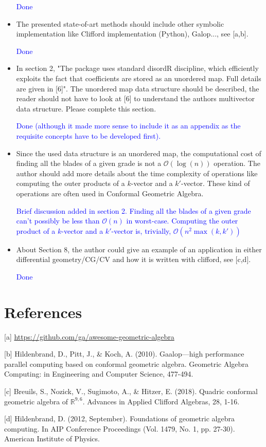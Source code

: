 \documentclass{article}
\begin{document}
\begin{itemize}
  \textcolor{blue}{Done}
  
\item The presented state-of-art methods should include other symbolic
  implementation like Clifford implementation (Python), Galop..., see
  [a,b].

  \textcolor{blue}{Done}

\item In section 2, "The package uses standard disordR discipline,
  which efficiently exploits the fact that coefficients are stored as
  an unordered map.  Full details are given in [6]".  The unordered
  map data structure should be described, the reader should not have
  to look at [6] to understand the authors multivector data
  structure. Please complete this section.

\textcolor{blue}{Done (although it made more sense to include it as an
  appendix as the requisite concepts have to be developed first).}
  
\item Since the used data structure is an unordered map, the
  computational cost of finding all the blades of a given grade is not
  a $\mathcal{O}(\log(n))$ operation.  The author should add more
  details about the time complexity of operations like computing the
  outer products of a $k$-vector and a $k'$-vector.  These kind of
  operations are often used in Conformal Geometric Algebra.

\textcolor{blue}{Brief discussion added in section 2.  Finding all the
  blades of a given grade can't possibly be less than $\mathcal{O}(n)$
  in worst-case.  Computing the outer product of a $k$-vector and a
  $k'$-vector is, trivially, $\mathcal{O}(n^2\max(k,k'))$}
  
\item About Section 8, the author could give an example of an
  application in either differential geometry/CG/CV and how it is
  written with clifford, see [c,d].

  \textcolor{blue}{Done}

\end{itemize}

\section*{References}

\begin{description}
\item{[a]} \url{https://github.com/ga/awesome-geometric-algebra}
\item{[b]} Hildenbrand, D., Pitt, J., \& Koch, A. (2010).
  Gaalop---high performance parallel computing based on conformal
  geometric algebra.  Geometric Algebra Computing: in Engineering and
  Computer Science, 477-494.
\item{[c]} Breuils, S., Nozick, V., Sugimoto, A., \& Hitzer,
  E. (2018).  Quadric conformal geometric algebra of
  $\mathbb{R}^{9,6}$.  Advances in Applied Clifford Algebras, 28,
  1-16.
\item{[d]} Hildenbrand, D. (2012, September).  Foundations of geometric
  algebra computing.  In AIP Conference Proceedings (Vol. 1479, No. 1,
  pp. 27-30).  American Institute of Physics.
\end{description}
\end{document}
